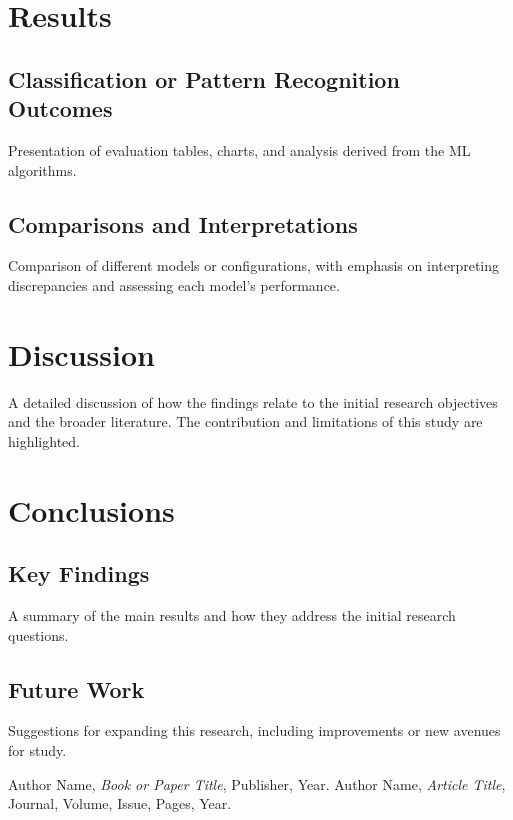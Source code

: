 \documentclass[a4paper,12pt]{report}
\begin{document}
\chapter{Results}

\section{Classification or Pattern Recognition Outcomes}
Presentation of evaluation tables, charts, and analysis derived from the ML algorithms.

\section{Comparisons and Interpretations}
Comparison of different models or configurations, with emphasis on interpreting discrepancies and assessing each model’s performance.

\chapter{Discussion}

A detailed discussion of how the findings relate to the initial research objectives and the broader literature. The contribution and limitations of this study are highlighted.

\chapter{Conclusions}

\section{Key Findings}
A summary of the main results and how they address the initial research questions.

\section{Future Work}
Suggestions for expanding this research, including improvements or new avenues for study.

\begin{thebibliography}{99}

 Author Name, \textit{Book or Paper Title}, Publisher, Year.
 Author Name, \textit{Article Title}, Journal, Volume, Issue, Pages, Year.

\end{thebibliography}
\clearpage
\end{document}
